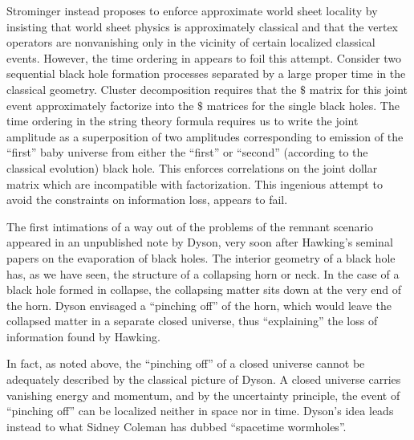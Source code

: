 Strominger instead proposes to enforce approximate world sheet locality
by insisting that world sheet physics is approximately classical and
that the vertex operators are nonvanishing only in the vicinity of
certain localized classical events.  However, the time ordering in
\babyamp appears to foil this attempt.  Consider two sequential black
hole formation processes separated by a large proper time in the
classical geometry.  Cluster decomposition requires that the $\$ $
matrix for this joint event approximately factorize into the $\$ $ matrices
for the single black holes.  The time ordering in the string theory
formula requires us to write the joint amplitude as a superposition of
two amplitudes corresponding to emission of the ``first'' baby universe from
either the ``first'' or ``second'' (according to the classical
evolution) black hole.  This enforces correlations on the joint dollar
matrix which are incompatible with factorization.  This ingenious attempt
to avoid the \bps constraints on information loss, appears to fail.


The first intimations of a way out of the problems of the remnant scenario
appeared in an unpublished note by Dyson, very soon after Hawking's seminal
papers on the evaporation of black holes.   The interior geometry of a black
hole has, as we have seen, the structure of a collapsing horn or neck.  In the
case of a black hole formed in collapse, the collapsing matter sits down
at the very end of the horn.  Dyson envisaged a ``pinching off'' of the horn,
which would leave the collapsed matter in a separate closed universe, thus
``explaining'' the loss of information found by Hawking.

In fact, as noted above,
the ``pinching off'' of a closed universe cannot be adequately described
by the classical picture of Dyson.  A closed universe carries vanishing energy
and momentum, and by the uncertainty principle, the event of ``pinching
off'' can be localized neither in space nor in time.  Dyson's idea leads
instead to what Sidney Coleman has dubbed ``spacetime wormholes''.

